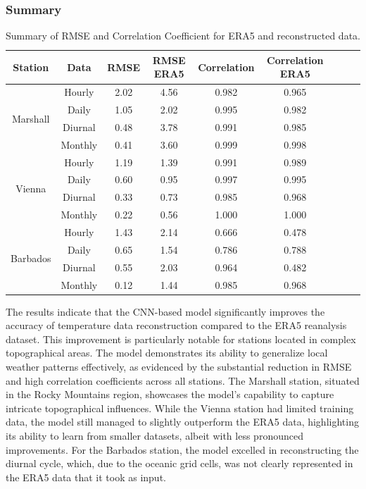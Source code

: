 \subsubsection*{Summary}

\begin{table}
\centering
\begin{tabular}{|c|c|c|c|c|c|c|c|c|}
\hline
Station & Data & RMSE & RMSE ERA5 & Correlation & Correlation ERA5 \\
\hline
\multirow{4}{*}{Marshall} & Hourly & 2.02 & 4.56 & 0.982 & 0.965 \\
& Daily & 1.05 & 2.02 & 0.995 & 0.982 \\
& Diurnal & 0.48 & 3.78 & 0.991 & 0.985 \\
& Monthly & 0.41 & 3.60 & 0.999 & 0.998 \\
\hline
\multirow{4}{*}{Vienna} & Hourly & 1.19 & 1.39 & 0.991 & 0.989 \\
& Daily & 0.60 & 0.95 & 0.997 & 0.995 \\
& Diurnal & 0.33 & 0.73 & 0.985 & 0.968 \\
& Monthly & 0.22 & 0.56 & 1.000 & 1.000 \\
\hline
\multirow{4}{*}{Barbados} & Hourly & 1.43 & 2.14 & 0.666 & 0.478 \\
& Daily & 0.65 & 1.54 & 0.786 & 0.788 \\
& Diurnal & 0.55 & 2.03 & 0.964 & 0.482 \\
& Monthly & 0.12 & 1.44 & 0.985 & 0.968 \\
\hline
\end{tabular}
\caption{Summary of RMSE and Correlation Coefficient for ERA5 and reconstructed data.}
\label{tab:results_summary}
\end{table}

The results indicate that the CNN-based model significantly improves the accuracy of temperature data reconstruction compared to the ERA5 reanalysis dataset. This improvement is particularly notable for stations located in complex topographical areas.
The model demonstrates its ability to generalize local weather patterns effectively, as evidenced by the substantial reduction in RMSE and high correlation coefficients across all stations. The Marshall station, situated in the Rocky Mountains region, showcases the model's capability to capture intricate topographical influences.
While the Vienna station had limited training data, the model still managed to slightly outperform the ERA5 data, highlighting its ability to learn from smaller datasets, albeit with less pronounced improvements.
For the Barbados station, the model excelled in reconstructing the diurnal cycle, which, due to the oceanic grid cells, was not clearly represented in the ERA5 data that it took as input.